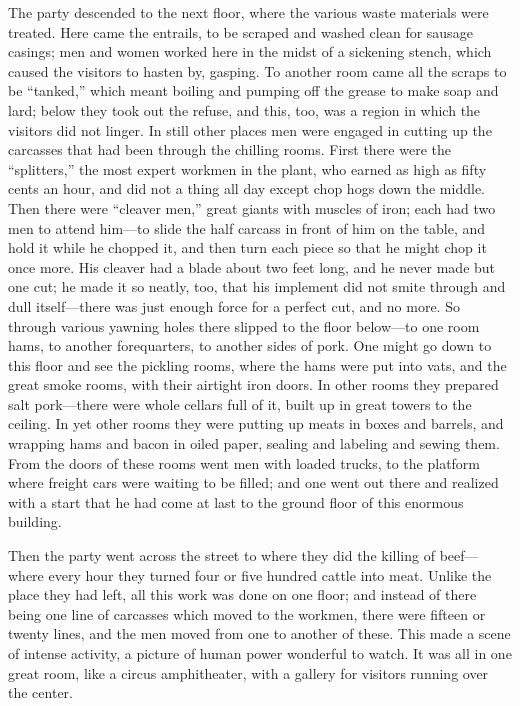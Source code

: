 \documentclass[
]{article}
\begin{document}
The party descended to the next floor, where the various waste materials were treated. Here came the entrails, to be scraped and washed clean for sausage casings; men and women worked here in the midst of a sickening stench, which caused the visitors to hasten by, gasping. To another room came all the scraps to be ``tanked,'' which meant boiling and pumping off the grease to make soap and lard; below they took out the refuse, and this, too, was a region in which the visitors did not linger. In still other places men were engaged in cutting up the carcasses that had been through the chilling rooms. First there were the ``splitters,'' the most expert workmen in the plant, who earned as high as fifty cents an hour, and did not a thing all day except chop hogs down the middle. Then there were ``cleaver men,'' great giants with muscles of iron; each had two men to attend him---to slide the half carcass in front of him on the table, and hold it while he chopped it, and then turn each piece so that he might chop it once more. His cleaver had a blade about two feet long, and he never made but one cut; he made it so neatly, too, that his implement did not smite through and dull itself---there was just enough force for a perfect cut, and no more. So through various yawning holes there slipped to the floor below---to one room hams, to another forequarters, to another sides of pork. One might go down to this floor and see the pickling rooms, where the hams were put into vats, and the great smoke rooms, with their airtight iron doors. In other rooms they prepared salt pork---there were whole cellars full of it, built up in great towers to the ceiling. In yet other rooms they were putting up meats in boxes and barrels, and wrapping hams and bacon in oiled paper, sealing and labeling and sewing them. From the doors of these rooms went men with loaded trucks, to the platform where freight cars were waiting to be filled; and one went out there and realized with a start that he had come at last to the ground floor of this enormous building.

Then the party went across the street to where they did the killing of beef---where every hour they turned four or five hundred cattle into meat. Unlike the place they had left, all this work was done on one floor; and instead of there being one line of carcasses which moved to the workmen, there were fifteen or twenty lines, and the men moved from one to another of these. This made a scene of intense activity, a picture of human power wonderful to watch. It was all in one great room, like a circus amphitheater, with a gallery for visitors running over the center.
\end{document}
